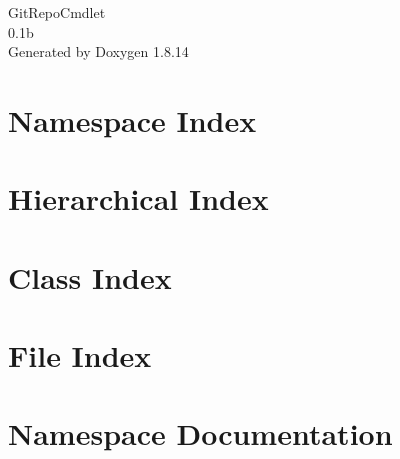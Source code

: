 \documentclass[twoside]{book}
\newcommand{\+}{\discretionary{\mbox{\scriptsize$\hookleftarrow$}}{}{}}
\newcommand{\clearemptydoublepage}{%
  \newpage{\pagestyle{empty}\cleardoublepage}%
}
\begin{document}
\hypersetup{pageanchor=false,
             bookmarksnumbered=true,
             pdfencoding=unicode
            }
\begin{titlepage}
\vspace*{7cm}
\begin{center}%
{\Large Git\+Repo\+Cmdlet \\[1ex]\large 0.\+1b }\\
\vspace*{1cm}
{\large Generated by Doxygen 1.8.14}\\
\end{center}
\end{titlepage}
\clearemptydoublepage
{}
\tableofcontents
\clearemptydoublepage
{}
\hypersetup{pageanchor=true}

\chapter{Namespace Index}

\chapter{Hierarchical Index}

\chapter{Class Index}

\chapter{File Index}

\chapter{Namespace Documentation}










\end{document}
